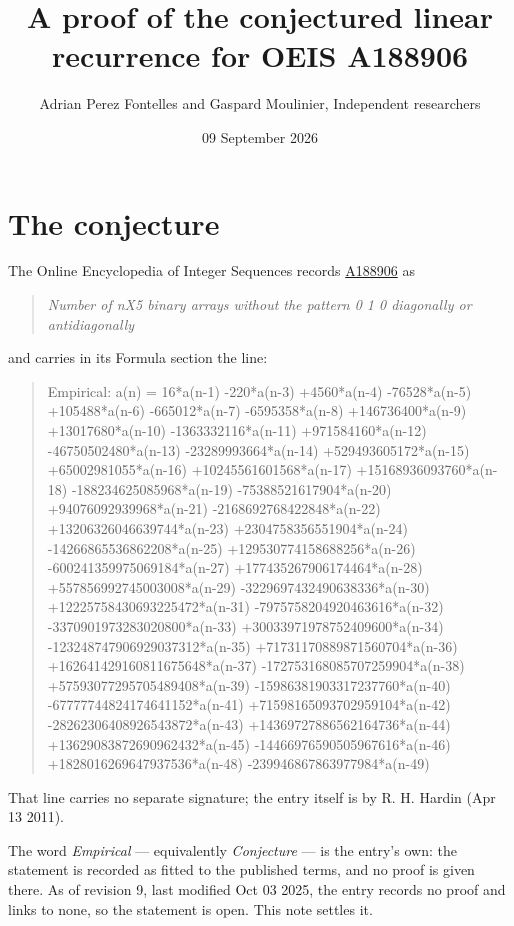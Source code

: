 \documentclass[11pt]{article}
\title{A proof of the conjectured linear recurrence for OEIS A188906}
\author{Adrian Perez Fontelles and Gaspard Moulinier, Independent researchers}
\date{09 September 2026}
\theoremstyle{definition}
\begin{document}
\maketitle
\section{The conjecture}

The Online Encyclopedia of Integer Sequences records \href{https://oeis.org/A188906}{A188906} as

\begin{quote}\itshape Number of nX5 binary arrays without the pattern 0 1 0 diagonally or antidiagonally\end{quote}

and carries in its Formula section the line:

\begin{quote}\ttfamily Empirical: a(n) = 16*a(n-1) -220*a(n-3) +4560*a(n-4) -76528*a(n-5) +105488*a(n-6) -665012*a(n-7) -6595358*a(n-8) +146736400*a(n-9) +13017680*a(n-10) -1363332116*a(n-11) +971584160*a(n-12) -46750502480*a(n-13) -23289993664*a(n-14) +529493605172*a(n-15) +65002981055*a(n-16) +10245561601568*a(n-17) +15168936093760*a(n-18) -188234625085968*a(n-19) -75388521617904*a(n-20) +94076092939968*a(n-21) -2168692768422848*a(n-22) +13206326046639744*a(n-23) +2304758356551904*a(n-24) -14266865536862208*a(n-25) +129530774158688256*a(n-26) -600241359975069184*a(n-27) +177435267906174464*a(n-28) +557856992745003008*a(n-29) -3229697432490638336*a(n-30) +12225758430693225472*a(n-31) -7975758204920463616*a(n-32) -3370901973283020800*a(n-33) +30033971978752409600*a(n-34) -123248747906929037312*a(n-35) +71731170889871560704*a(n-36) +162641429160811675648*a(n-37) -172753168085707259904*a(n-38) +57593077295705489408*a(n-39) -15986381903317237760*a(n-40) -67777744824174641152*a(n-41) +71598165093702959104*a(n-42) -28262306408926543872*a(n-43) +14369727886562164736*a(n-44) +13629083872690962432*a(n-45) -14466976590505967616*a(n-46) +1828016269647937536*a(n-48) -239946867863977984*a(n-49)\end{quote}

That line carries no separate signature; the entry itself is by R. H. Hardin (Apr 13 2011).

The word {\itshape Empirical} --- equivalently {\itshape Conjecture} --- is the entry's own: the statement is recorded as fitted to the published terms, and no proof is given there. As of revision 9, last modified Oct 03 2025, the entry records no proof and links to none, so the statement is open. This note settles it.
\end{document}
